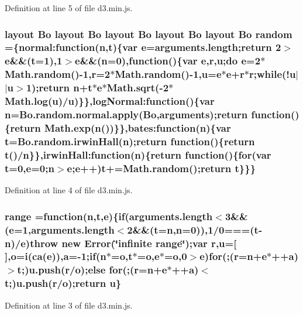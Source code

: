 Definition at line 5 of file d3.\+min.\+js.

\subsubsection[{random}]{ {\bf layout} {\bf Bo} {\bf layout} {\bf Bo} {\bf layout} {\bf Bo} {\bf layout} {\bf Bo} {\bf layout} {\bf Bo} random =\{normal\+:function({\bf n},t)\{var {\bf e}=arguments.\+length;{\bf return} 2$>${\bf e}\&\&(t=1),1$>${\bf e}\&\&({\bf n}=0),function()\{var {\bf e},{\bf r},u;do {\bf e}=2$\ast$Math.\+random()-\/1,{\bf r}=2$\ast$Math.\+random()-\/1,u={\bf e}$\ast${\bf e}+{\bf r}$\ast${\bf r};while(!u$\vert$$\vert$u$>$1);{\bf return} {\bf n}+t$\ast${\bf e}$\ast${\bf Math.\+sqrt}(-\/2$\ast${\bf Math.\+log}(u)/u)\}\},log\+Normal\+:function()\{var {\bf n}=Bo.\+random.\+normal.\+apply({\bf Bo},arguments);{\bf return} function()\{{\bf return} Math.\+exp({\bf n}())\}\},bates\+:function({\bf n})\{var t=Bo.\+random.\+irwin\+Hall({\bf n});{\bf return} function()\{{\bf return} t()/{\bf n}\}\},irwin\+Hall\+:function({\bf n})\{{\bf return} function()\{{\bf for}(var t=0,{\bf e}=0;{\bf n}$>${\bf e};{\bf e}++)t+=Math.\+random();{\bf return} t\}\}\}}\label{d3_8min_8js_a21a6a8118fb8f1a11bdab5b3b0d4e5f6}


Definition at line 4 of file d3.\+min.\+js.

\subsubsection[{range}]{ range =function({\bf n},t,{\bf e})\{{\bf if}(arguments.\+length$<$3\&\&({\bf e}=1,arguments.\+length$<$2\&\&(t={\bf n},{\bf n}=0)),1/0===(t-\/{\bf n})/{\bf e})throw new {\bf Error}(\char`\"{}infinite range\char`\"{});var {\bf r},u=[$\,$],{\bf o}={\bf i}({\bf ca}({\bf e})),{\bf a}=-\/1;{\bf if}({\bf n}$\ast$={\bf o},t$\ast$={\bf o},{\bf e}$\ast$={\bf o},0$>${\bf e}){\bf for}(;({\bf r}={\bf n}+{\bf e}$\ast$++{\bf a})$>$t;)u.\+push({\bf r}/{\bf o});{\bf else} {\bf for}(;({\bf r}={\bf n}+{\bf e}$\ast$++{\bf a})$<$t;)u.\+push({\bf r}/{\bf o});{\bf return} u\}}\label{d3_8min_8js_a3370df69994ddee947b5acb08e416eed}


Definition at line 3 of file d3.\+min.\+js.

